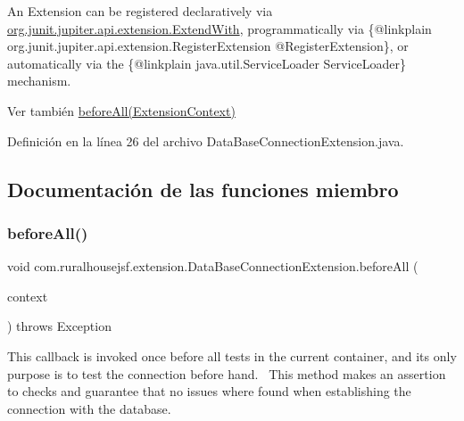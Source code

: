 An Extension can be registered {\ttfamily declaratively} via \mbox{\hyperlink{}{org.\+junit.\+jupiter.\+api.\+extension.\+Extend\+With}}, {\ttfamily programmatically} via \{@linkplain org.\+junit.\+jupiter.\+api.\+extension.\+Register\+Extension @\+Register\+Extension\}, or {\ttfamily automatically} via the \{@linkplain java.\+util.\+Service\+Loader Service\+Loader\} mechanism.

\begin{DoxySeeAlso}{Ver también}
\mbox{\hyperlink{classcom_1_1ruralhousejsf_1_1extension_1_1_data_base_connection_extension_ae1fe703d5f0bdd5f29f0f4b9f0645e3e}{before\+All(\+Extension\+Context)}} 
\end{DoxySeeAlso}


Definición en la línea 26 del archivo Data\+Base\+Connection\+Extension.\+java.



\subsection{Documentación de las funciones miembro}
\mbox{\label{classcom_1_1ruralhousejsf_1_1extension_1_1_data_base_connection_extension_ae1fe703d5f0bdd5f29f0f4b9f0645e3e}} 
\subsubsection{\texorpdfstring{beforeAll()}{beforeAll()}}
{\footnotesize\ttfamily void com.\+ruralhousejsf.\+extension.\+Data\+Base\+Connection\+Extension.\+before\+All (\begin{DoxyParamCaption}\item[{Extension\+Context}]{context }\end{DoxyParamCaption}) throws Exception}

This callback is invoked once {\ttfamily before} all tests in the current container, and its only purpose is to test the connection before hand.~\newline
 This method makes an assertion to checks and guarantee that no issues where found when establishing the connection with the database.


